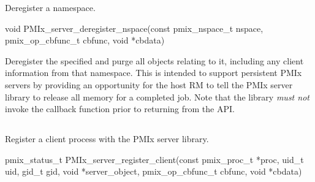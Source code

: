 \summary

Deregister a namespace.

\format

\cspecificstart
\begin{codepar}
void PMIx_server_deregister_nspace(const pmix_nspace_t nspace,
                        pmix_op_cbfunc_t cbfunc, void *cbdata)
\end{codepar}
\cspecificend

\begin{arglist}
\end{arglist}

\descr

Deregister the specified  and purge all objects relating to it, including any client information from that namespace.
This is intended to support persistent \ac{PMIx} servers by providing an opportunity for the host \ac{RM} to tell the \ac{PMIx} server library to release all memory for a completed job. Note that the library \emph{must not} invoke the callback function prior to returning from the \ac{API}.


\subsection{}

\summary

Register a client process with the PMIx server library.

\format

\cspecificstart
\begin{codepar}
pmix_status_t
PMIx_server_register_client(const pmix_proc_t *proc,
                        uid_t uid, gid_t gid,
                        void *server_object,
                        pmix_op_cbfunc_t cbfunc, void *cbdata)
\end{codepar}
\cspecificend

\begin{arglist}
\end{arglist}

